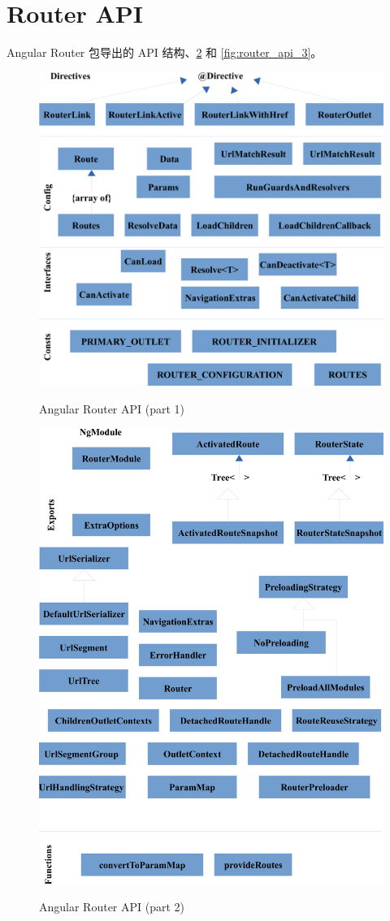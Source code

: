 \section{Router API}


Angular Router 包导出的 API 结构、\ref{fig:router_api_2} 和 \ref{fig:router_api_3}。

\begin{figure}[!hbt]
  \centering
  \caption{Angular Router API (part 1)}
  \includegraphics[width=0.65\linewidth]{13_the_router_package/router_api_1}
  \label{fig:router_api_1}
\end{figure}

\begin{figure}[!hbt]
  \centering
  \caption{Angular Router API (part 2)}
  \includegraphics[width=0.75\linewidth]{13_the_router_package/router_api_2}
  \label{fig:router_api_2}
\end{figure}

